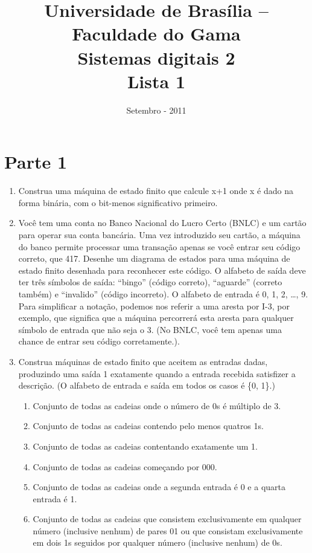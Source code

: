 \documentclass[a4paper,10pt]{article}
\title{ \textbf{Universidade de Brasília -- Faculdade do Gama \\ Sistemas digitais 2 \\ Lista 1 }}
\date{Setembro - 2011}
\begin{document}
\maketitle

\section{Parte 1}
\begin{enumerate}
 \item Construa uma máquina de estado finito que calcule x+1 onde x é dado na forma binária, com o bit-menos significativo primeiro.
 \item Você tem uma conta no Banco Nacional do Lucro Certo (BNLC) e um cartão para operar sua conta bancária. Uma vez introduzido seu cartão, a máquina do banco 
       permite processar uma transação apenas se você entrar seu código correto, que 417. Desenhe um diagrama de estados para uma máquina de estado finito desenhada 
       para reconhecer este código. O alfabeto de saída deve ter três símbolos de saída: “bingo” (código correto), “aguarde” (correto também) e “invalido” (código 
       incorreto). O alfabeto de entrada é {0, 1, 2, …, 9}. Para simplificar a notação, podemos nos referir a uma aresta por I-{3}, por exemplo, que significa que a 
       máquina percorrerá esta aresta para qualquer símbolo de entrada que não seja o 3. (No BNLC, você tem apenas uma chance de entrar seu código corretamente.).
 \item Construa máquinas de estado finito que aceitem as entradas dadas, produzindo uma saída 1 exatamente quando a entrada recebida satisfizer a descrição. (O alfabeto 
       de entrada e saída em todos os casos é \{0, 1\}.)
       \begin{enumerate}
	\item Conjunto de todas as cadeias onde o número de 0s é múltiplo de 3.
	\item Conjunto de todas as cadeias contendo pelo menos quatros 1s.
	\item Conjunto de todas as cadeias contentando exatamente um 1.
	\item Conjunto de todas as cadeias começando por 000.
	\item Conjunto de todas as cadeias onde a segunda entrada é 0 e a quarta entrada é 1.
	\item Conjunto de todas as cadeias que consistem exclusivamente em qualquer número (inclusive nenhum) de pares 01 ou que consistam exclusivamente em dois 1s seguidos por qualquer número (inclusive nenhum) de 0s.

\end{enumerate}
\end{enumerate}
\end{document}
